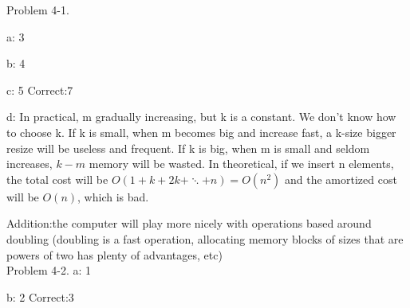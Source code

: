 \documentclass[12pt,twoside]{article}
\begin{document}
Problem 4-1.

  a: 3

  b: 4

  c: 5 Correct:7

  d: In practical, m gradually increasing, but k is a constant. We don't know how to 
  choose k. If k is small, when m becomes big and increase fast, a k-size bigger 
  resize will be useless and frequent. If k is big, when m is small and seldom 
  increases, $k-m$ memory will be wasted. In theoretical, if we insert n elements,
  the total cost will be $O(1+k+2k+\ddots+n) = O(n^2)$ and the amortized cost will
  be $O(n)$, which is bad.

  Addition:the computer will play more nicely with operations based around
  doubling (doubling is a fast operation, allocating memory blocks of sizes 
  that are powers of two has plenty of advantages, etc)\\

Problem 4-2.
  a: 1

  b: 2 Correct:3
\end{document}
